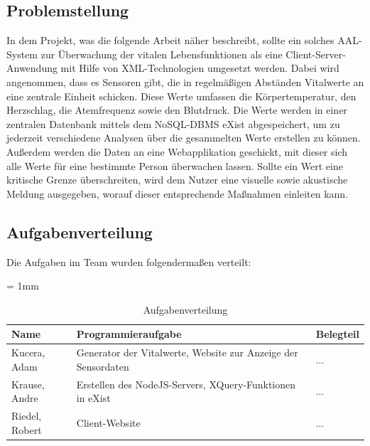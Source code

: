 \subsection{Problemstellung}
In dem Projekt, was die folgende Arbeit näher beschreibt, sollte ein solches AAL-System zur Überwachung der vitalen Lebensfunktionen als eine Client-Server-Anwendung mit Hilfe von XML-Technologien umgesetzt werden. Dabei wird angenommen, dass es Sensoren gibt, die in regelmäßigen Abständen Vitalwerte an eine zentrale Einheit schicken. Diese Werte umfassen die Körpertemperatur, den Herzschlag, die Atemfrequenz sowie den Blutdruck. Die Werte werden in einer zentralen Datenbank mittels dem NoSQL-DBMS eXist abgespeichert, um zu jederzeit verschiedene Analysen über die gesammelten Werte erstellen zu können. Außerdem werden die Daten an eine Webapplikation geschickt, mit dieser sich alle Werte für eine bestimmte Person überwachen lassen. Sollte ein Wert eine kritische Grenze überschreiten, wird dem Nutzer eine visuelle sowie akustische Meldung ausgegeben, worauf dieser entsprechende Maßnahmen einleiten kann.

\subsection{Aufgabenverteilung}
Die Aufgaben im Team wurden folgendermaßen verteilt:

\begin{table}[H]
	\sffamily
	\caption{Aufgabenverteilung}
	\tabulinesep = 1mm %
	\centering
		\begin{tabu} to 0.9\textwidth { X[1.7]  X[3] X[3]}
		\hline
		\textbf{Name} & \textbf{Programmieraufgabe} & \textbf{Belegteil}\\
		\hline 
		Kucera, Adam & Generator der Vitalwerte, Website zur Anzeige der Sensordaten & ...\\

		Krause, Andre & Erstellen des NodeJS-Servers, XQuery-Funktionen in eXist & ...\\

		Riedel, Robert & Client-Website & ...\\
	\end{tabu}
\end{table}